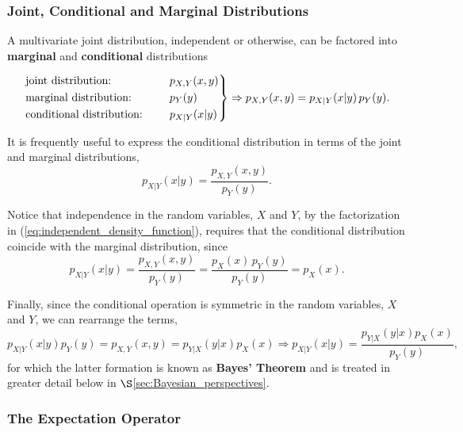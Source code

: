 \documentclass[12pt, twoside, draft]{article}
\begin{document}
\subsubsection{Joint, Conditional and Marginal Distributions}\label{sec:joint_conditional_marginal_distributions}
A multivariate joint distribution, independent or otherwise, can be factored into \textbf{marginal} and \textbf{conditional} distributions

\begin{equation}
\begin{rcases}
\text{joint distribution: } \hspace{10pt} & p_{X,Y} (x,y) \\
\text{marginal distribution: } \hspace{10pt} & p_Y(y) \\
\text{conditional distribution: } \hspace{10pt} &  p_{X|Y}(x|y)
\end{rcases} \Rightarrow
p_{X,Y} (x,y) = p_{X|Y}(x|y) \, p_Y(y).
\end{equation}

It is frequently useful to express the conditional distribution in terms of the joint and marginal distributions,
\begin{equation}
p_{X|Y}(x|y) = \frac{p_{X,Y} (x,y)}{p_Y(y)}.
\end{equation}

Notice that independence in the random variables, $X$ and $Y$, by the factorization in (\ref{eq:independent_density_function}), requires that the conditional distribution coincide with the marginal distribution, since
\begin{equation}
p_{X|Y}(x|y) = \frac{p_{X,Y} (x,y)}{p_Y(y)} = \frac{p_X(x) \, p_Y(y)}{p_Y(y)} = p_X(x).
\end{equation}


Finally, since the conditional operation is symmetric in the random variables, $X$ and $Y$, we can rearrange the terms,
\begin{equation}\label{eq:Bayes_theorem_density}
p_{X|Y}(x|y) {p_Y(y)} = p_{X,Y} (x,y) = p_{Y|X}(y|x) {p_X(x)} \Rightarrow p_{X|Y}(x|y) =  \frac{ p_{Y|X}(y|x) {p_X(x)}}{p_Y(y)},
\end{equation}
for which the latter formation is known as \textbf{Bayes' Theorem} and is treated in greater detail below in $\S$\ref{sec:Bayesian_perspectives}. 

\subsubsection{The Expectation Operator}\label{sec:expectation_operator}
\end{document}

